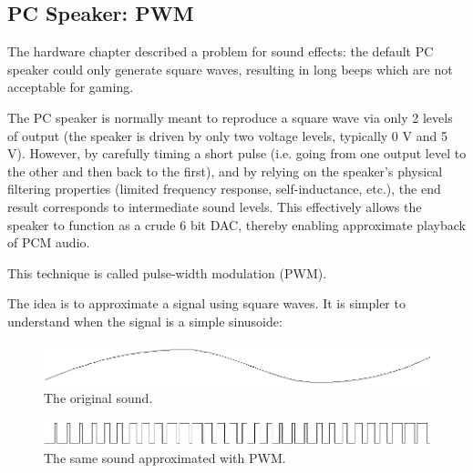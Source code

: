 
\subsection{PC Speaker: PWM}
The hardware chapter described a problem for sound effects: the default PC speaker could only generate square waves, resulting in long beeps which are not acceptable for gaming.\\

\par
 \begin{fancyquotes}
  The PC speaker is normally meant to reproduce a square wave via only 2 levels of output (the speaker is driven by only two voltage levels, typically 0 V and 5 V). However, by carefully timing a short pulse (i.e. going from one output level to the other and then back to the first), and by relying on the speaker's physical filtering properties (limited frequency response, self-inductance, etc.), the end result corresponds to intermediate sound levels. This effectively allows the speaker to function as a crude 6 bit DAC, thereby enabling approximate playback of PCM audio.\\
  \par
  This technique is called pulse-width modulation (PWM).
 \end{fancyquotes}
\par
  
The idea is to approximate a signal using square waves. It is simpler to understand when the signal is a simple sinusoide:
\par
\begin{figure}[H]
\centering
 \includegraphics[width=\textwidth]{imgs/drawings/pwm/sinuois.png}
 \caption{The original sound.}
 \end{figure}
\par

\par
\begin{figure}[H]
\centering
 \includegraphics[width=\textwidth]{imgs/drawings/pwm/pwm_approximation.png}
 \caption{The same sound approximated with PWM.}
 \end{figure}
\par

